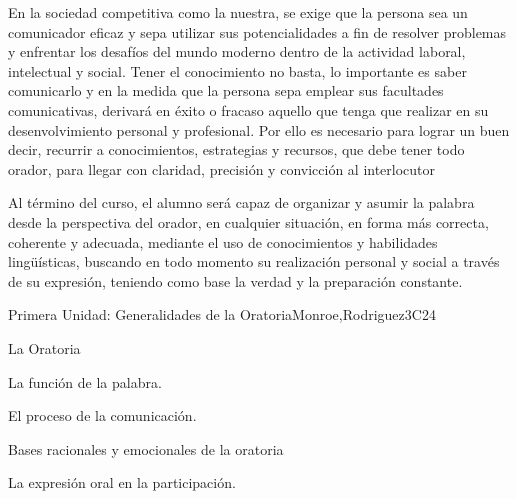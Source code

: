 \begin{syllabus}


\begin{justification}
En la sociedad competitiva como la nuestra,  se exige que la persona sea un comunicador eficaz y  sepa utilizar sus potencialidades a fin de resolver problemas y enfrentar los desafíos del mundo moderno dentro de la actividad laboral, intelectual y social. Tener el conocimiento no basta, lo importante es saber comunicarlo y en la medida que la persona sepa emplear sus facultades comunicativas, derivará en éxito o fracaso aquello que tenga que realizar en su desenvolvimiento personal y profesional. Por ello es necesario para lograr un buen decir, recurrir a conocimientos, estrategias y recursos, que debe tener todo orador, para llegar con claridad, precisión y convicción al interlocutor
\end{justification}

\begin{goals}
\item Al término del curso, el alumno será capaz de organizar y asumir la palabra desde la perspectiva del orador, en cualquier situación, en forma más correcta, coherente  y adecuada, mediante el uso de conocimientos y habilidades lingüísticas, buscando en todo momento su realización personal y social  a través de su expresión, teniendo como base  la verdad y la preparación constante.
\end{goals}

\begin{outcomes}
    \item {}
    \item {}
    \item {}
\end{outcomes}

\begin{competences}
    \item {}
    \item {}
\end{competences}

\begin{unit}{}{Primera Unidad: Generalidades de la Oratoria}{Monroe,Rodriguez}{3}{C24}
\begin{topics}
	\item La Oratoria
	\item La función de la palabra.
	\item El proceso de la comunicación.
	\item Bases racionales y emocionales de la oratoria
		\begin{subtopics}
			\item La expresión oral en la participación.
		\end{subtopics}


\end{topics}
\end{unit}
\end{syllabus}

